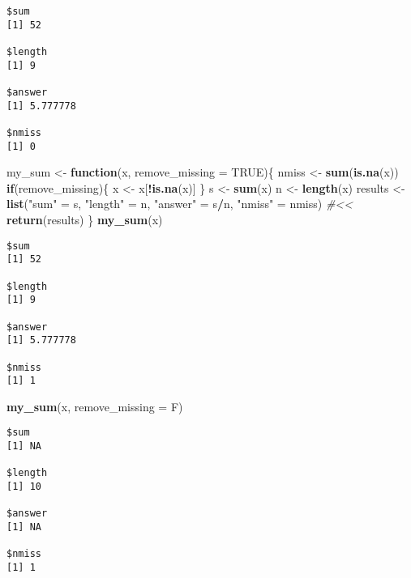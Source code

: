 \documentclass[12pt,letterpaperpaper,openany]{book}
\newenvironment{Shaded}{\begin{snugshade}}{\end{snugshade}}
\newcommand{\CommentTok}[1]{\textcolor[rgb]{0.56,0.35,0.01}{\textit{#1}}}
\newcommand{\ControlFlowTok}[1]{\textcolor[rgb]{0.13,0.29,0.53}{\textbf{#1}}}
\newcommand{\DataTypeTok}[1]{\textcolor[rgb]{0.13,0.29,0.53}{#1}}
\newcommand{\KeywordTok}[1]{\textcolor[rgb]{0.13,0.29,0.53}{\textbf{#1}}}
\newcommand{\NormalTok}[1]{#1}
\newcommand{\OperatorTok}[1]{\textcolor[rgb]{0.81,0.36,0.00}{\textbf{#1}}}
\newcommand{\OtherTok}[1]{\textcolor[rgb]{0.56,0.35,0.01}{#1}}
\newcommand{\StringTok}[1]{\textcolor[rgb]{0.31,0.60,0.02}{#1}}
\begin{document}
\begin{verbatim}
$sum
[1] 52

$length
[1] 9

$answer
[1] 5.777778

$nmiss
[1] 0
\end{verbatim}

\begin{Shaded}
\begin{Highlighting}[]
\NormalTok{my_sum <-}\StringTok{ }\ControlFlowTok{function}\NormalTok{(x, }\DataTypeTok{remove_missing =} \OtherTok{TRUE}\NormalTok{)\{ }
\NormalTok{  nmiss <-}\StringTok{ }\KeywordTok{sum}\NormalTok{(}\KeywordTok{is.na}\NormalTok{(x)) }
  \ControlFlowTok{if}\NormalTok{(remove_missing)\{}
\NormalTok{    x <-}\StringTok{ }\NormalTok{x[}\OperatorTok{!}\KeywordTok{is.na}\NormalTok{(x)]}
\NormalTok{  \}}
\NormalTok{  s <-}\StringTok{ }\KeywordTok{sum}\NormalTok{(x)}
\NormalTok{  n <-}\StringTok{ }\KeywordTok{length}\NormalTok{(x)}
\NormalTok{  results <-}\StringTok{ }\KeywordTok{list}\NormalTok{(}\StringTok{"sum"}\NormalTok{ =}\StringTok{ }\NormalTok{s, }\StringTok{"length"}\NormalTok{ =}\StringTok{ }\NormalTok{n, }\StringTok{"answer"}\NormalTok{ =}\StringTok{ }\NormalTok{s}\OperatorTok{/}\NormalTok{n, }\StringTok{"nmiss"}\NormalTok{ =}\StringTok{ }\NormalTok{nmiss) }\CommentTok{#<<}
  \KeywordTok{return}\NormalTok{(results) }
\NormalTok{\}}
\KeywordTok{my_sum}\NormalTok{(x)}
\end{Highlighting}
\end{Shaded}

\begin{verbatim}
$sum
[1] 52

$length
[1] 9

$answer
[1] 5.777778

$nmiss
[1] 1
\end{verbatim}

\begin{Shaded}
\begin{Highlighting}[]
\KeywordTok{my_sum}\NormalTok{(x, }\DataTypeTok{remove_missing =}\NormalTok{ F)}
\end{Highlighting}
\end{Shaded}

\begin{verbatim}
$sum
[1] NA

$length
[1] 10

$answer
[1] NA

$nmiss
[1] 1
\end{verbatim}
\end{document}
